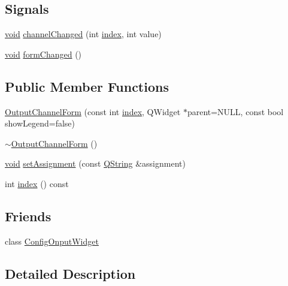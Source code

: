 \subsection*{\-Signals}
\begin{DoxyCompactItemize}
\item 
\hyperlink{group___u_a_v_objects_plugin_ga444cf2ff3f0ecbe028adce838d373f5c}{void} \hyperlink{group___config_plugin_gabf138ec695ffe189e33d200b031e2687}{channel\-Changed} (int \hyperlink{group___config_plugin_ga04c058165995634381c105cad76f4209}{index}, int value)
\item 
\hyperlink{group___u_a_v_objects_plugin_ga444cf2ff3f0ecbe028adce838d373f5c}{void} \hyperlink{group___config_plugin_gaa777808eac827fbf95642188024fc667}{form\-Changed} ()
\end{DoxyCompactItemize}
\subsection*{\-Public \-Member \-Functions}
\begin{DoxyCompactItemize}
\item 
\hyperlink{group___config_plugin_ga5b19b5a7b71ecffbf0b3f5ac2cbae18d}{\-Output\-Channel\-Form} (const int \hyperlink{group___config_plugin_ga04c058165995634381c105cad76f4209}{index}, \-Q\-Widget $\ast$parent=\-N\-U\-L\-L, const bool show\-Legend=false)
\item 
\hyperlink{group___config_plugin_ga6b25b9aa17895f0d557626e4dea077dd}{$\sim$\-Output\-Channel\-Form} ()
\item 
\hyperlink{group___u_a_v_objects_plugin_ga444cf2ff3f0ecbe028adce838d373f5c}{void} \hyperlink{group___config_plugin_gacdf981958669fa47fe697e39fa529a16}{set\-Assignment} (const \hyperlink{group___u_a_v_objects_plugin_gab9d252f49c333c94a72f97ce3105a32d}{\-Q\-String} \&assignment)
\item 
int \hyperlink{group___config_plugin_ga04c058165995634381c105cad76f4209}{index} () const 
\end{DoxyCompactItemize}
\subsection*{\-Friends}
\begin{DoxyCompactItemize}
\item 
class \hyperlink{group___config_plugin_ga92a68401074780ed6cadf27f127892e3}{\-Config\-Onput\-Widget}
\end{DoxyCompactItemize}


\subsection{\-Detailed \-Description}


